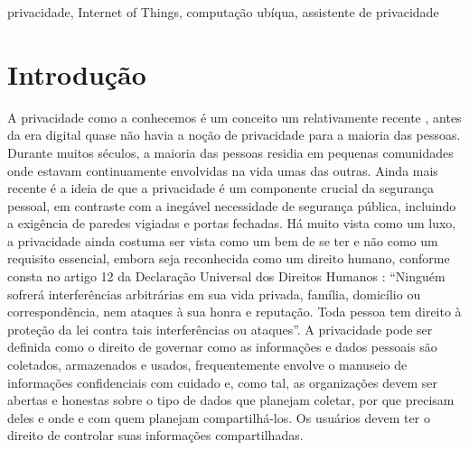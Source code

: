 \documentclass[conference]{IEEEtran}
\begin{document}
\begin{IEEEkeywords}
privacidade, Internet of Things, computação ubíqua, assistente de privacidade

\end{IEEEkeywords}




















\section{Introdução}

A privacidade como a conhecemos é um conceito um relativamente recente \cite{vincent2016privacy, moore2017privacy},
antes da era digital quase não havia a noção de privacidade para a maioria
das pessoas. Durante muitos séculos, a maioria das pessoas residia em pequenas
comunidades onde estavam continuamente envolvidas na vida umas das outras.
Ainda mais recente é a ideia de que a privacidade é um componente crucial
da segurança pessoal, em contraste com a inegável necessidade de segurança
pública, incluindo a exigência de paredes vigiadas e portas fechadas. Há
muito vista como um luxo, a privacidade ainda costuma ser vista como um bem
de se ter e não como um requisito essencial, embora seja reconhecida como
um direito humano, conforme consta no artigo 12 da Declaração Universal dos
Direitos Humanos \cite{RooseveltUniversal}: ``Ninguém sofrerá interferências
arbitrárias em sua vida privada, família, domicílio ou correspondência, nem
ataques à sua honra e reputação. Toda pessoa tem direito à proteção da lei contra tais interferências ou ataques''. A privacidade pode ser definida \cite{InternationalWhat, SpiekermannEngineering} como o direito de governar como as informações e dados pessoais são coletados, armazenados e usados, frequentemente envolve o manuseio de informações confidenciais com cuidado e, como tal, as organizações devem ser abertas e honestas sobre o tipo de dados que planejam coletar, por que precisam deles e onde e com quem planejam compartilhá-los. Os usuários devem ter o direito de controlar suas informações compartilhadas.
\end{document}
